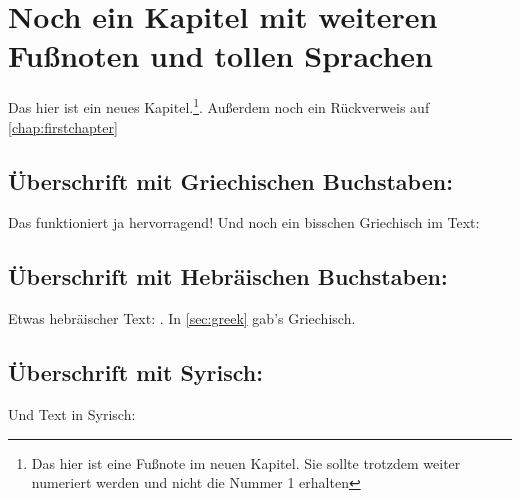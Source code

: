 \documentclass{scrreport}
\begin{document}
\chapter{Noch ein Kapitel mit weiteren Fußnoten und tollen Sprachen}
Das hier ist ein neues Kapitel.\footnote{Das hier ist eine Fußnote im neuen Kapitel. Sie sollte trotzdem weiter numeriert werden und nicht die Nummer 1 erhalten}. Außerdem noch ein Rückverweis auf \autoref{chap:firstchapter}

\section{Überschrift mit Griechischen Buchstaben: }
\label{sec:greek}
Das funktioniert ja hervorragend! Und noch ein bisschen Griechisch im Text: 

\section{Überschrift mit Hebräischen Buchstaben: }
Etwas hebräischer Text: . In \autoref{sec:greek} gab's Griechisch.


\section{Überschrift mit Syrisch:  }
Und Text in Syrisch:  
\end{document}
